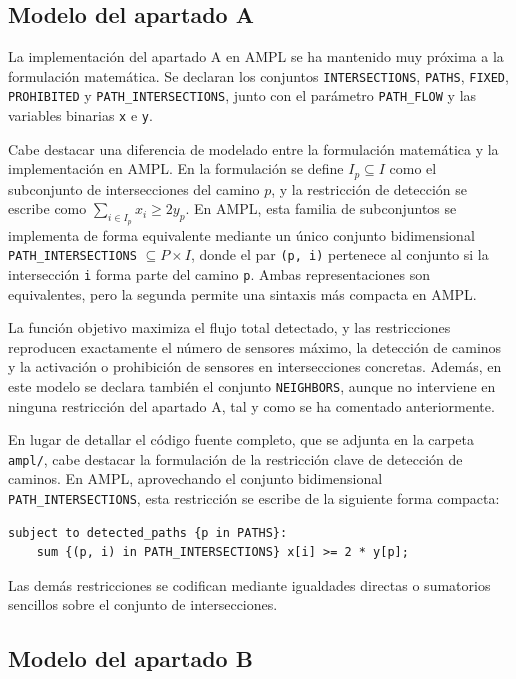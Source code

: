 \documentclass[12pt,a4paper]{article}
\begin{document}
\subsection{Modelo del apartado A}

La implementación del apartado A en AMPL se ha mantenido muy próxima a la formulación matemática. Se declaran los conjuntos \texttt{INTERSECTIONS}, \texttt{PATHS}, \texttt{FIXED}, \texttt{PROHIBITED} y \texttt{PATH\_INTERSECTIONS}, junto con el parámetro \texttt{PATH\_FLOW} y las variables binarias \texttt{x} e \texttt{y}.

Cabe destacar una diferencia de modelado entre la formulación matemática y la implementación en AMPL. En la formulación se define \(I_p \subseteq I\) como el subconjunto de intersecciones del camino \(p\), y la restricción de detección se escribe como \(\sum_{i \in I_p} x_i \geq 2y_p\). En AMPL, esta familia de subconjuntos se implementa de forma equivalente mediante un único conjunto bidimensional \texttt{PATH\_INTERSECTIONS} \(\subseteq P \times I\), donde el par \texttt{(p, i)} pertenece al conjunto si la intersección \texttt{i} forma parte del camino \texttt{p}. Ambas representaciones son equivalentes, pero la segunda permite una sintaxis más compacta en AMPL.

La función objetivo maximiza el flujo total detectado, y las restricciones reproducen exactamente el número de sensores máximo, la detección de caminos y la activación o prohibición de sensores en intersecciones concretas. Además, en este modelo se declara también el conjunto \texttt{NEIGHBORS}, aunque no interviene en ninguna restricción del apartado A, tal y como se ha comentado anteriormente.

En lugar de detallar el código fuente completo, que se adjunta en la carpeta \texttt{ampl/}, cabe destacar la formulación de la restricción clave de detección de caminos. En AMPL, aprovechando el conjunto bidimensional \texttt{PATH\_INTERSECTIONS}, esta restricción se escribe de la siguiente forma compacta:

\begin{lstlisting}[language=ampl]
subject to detected_paths {p in PATHS}:
    sum {(p, i) in PATH_INTERSECTIONS} x[i] >= 2 * y[p];
\end{lstlisting}

Las demás restricciones se codifican mediante igualdades directas o sumatorios sencillos sobre el conjunto de intersecciones.

\subsection{Modelo del apartado B}
\end{document}
